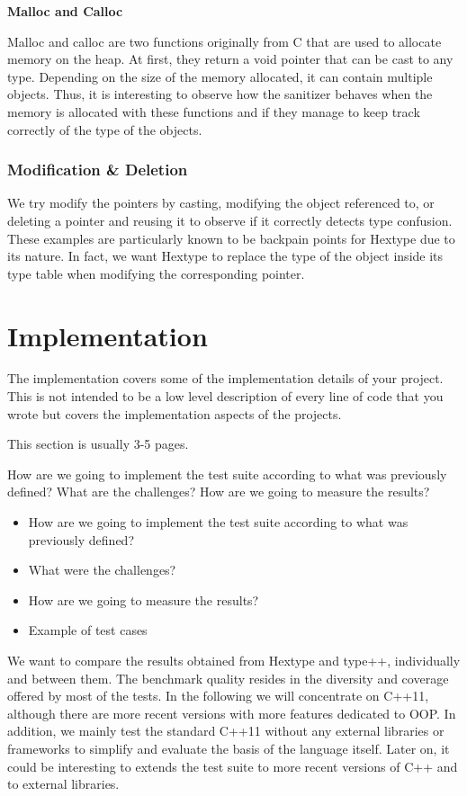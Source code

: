 \documentclass[a4paper,11pt,oneside]{report}
\begin{document}
\textbf{Malloc and Calloc}

\noindent{} Malloc and calloc are two functions originally from C that are used to allocate memory on the heap. At first, they
return a void pointer that can be cast to any type. Depending on the size of the memory allocated, it can contain multiple objects.
Thus, it is interesting to observe how the sanitizer behaves when the memory is allocated with these functions and if they manage
to keep track correctly of the type of the objects.

\subsection{Modification \& Deletion}

We try modify the pointers by casting, modifying the object referenced to, 
or deleting a pointer and reusing it to observe if it correctly detects type confusion. These examples are particularly known to 
be backpain points for Hextype due to its nature. In fact, we want Hextype to replace the type of the object inside its type table 
when modifying the corresponding pointer. 


\chapter{Implementation}

The implementation covers some of the implementation details of your project.
This is not intended to be a low level description of every line of code that
you wrote but covers the implementation aspects of the projects.

This section is usually 3-5 pages.

How are we going to implement the test suite according to what was previously defined? What are the challenges? 
How are we going to measure the results?

\begin{itemize}
       \item How are we going to implement the test suite according to what was previously defined? 
       \item What were the challenges?
       \item How are we going to measure the results?
       \item Example of test cases
\end{itemize}

We want to compare the results obtained from Hextype and type++, individually and between them. The benchmark quality resides 
in the diversity and coverage offered by most of the tests. In the following we will concentrate on C++11,
although there are more recent versions with more features dedicated to OOP. In addition, we mainly test the standard
C++11 without any external libraries or frameworks to simplify and evaluate the basis of the language itself. Later on,
it could be interesting to extends the test suite to more recent versions of C++ and to external libraries. 
\end{document}
